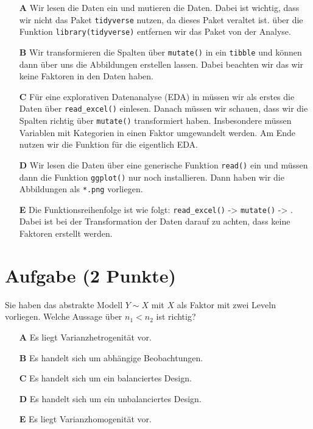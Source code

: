 \documentclass[a4paper, 9pt]{scrartcl}\usepackage[]{graphicx}\usepackage[]{xcolor}
\begin{document}
\begin{enumerate}
\item [\textbf{A} \msquare] Wir lesen die Daten ein und mutieren die Daten. Dabei ist wichtig, dass wir nicht das Paket \texttt{tidyverse} nutzen, da dieses Paket veraltet ist. über die Funktion \texttt{library(tidyverse)} entfernen wir das Paket von der Analyse.
\item [\textbf{B} \msquare] Wir transformieren die Spalten über \texttt{mutate()} in ein \texttt{tibble} und können dann über  uns die Abbildungen erstellen lassen. Dabei beachten wir das wir keine Faktoren in den Daten haben.
\item [\textbf{C} \msquare] Für eine explorativen Datenanalyse (EDA) in \Rlogo müssen wir als erstes die Daten über \texttt{read\_excel()} einlesen. Danach müssen wir schauen, dass wir die Spalten richtig über \texttt{mutate()} transformiert haben. Insbesondere müssen Variablen mit Kategorien in einen Faktor umgewandelt werden. Am Ende nutzen wir die Funktion  für die eigentlich EDA.
\item [\textbf{D} \msquare] Wir lesen die Daten über eine generische Funktion \texttt{read()} ein und müssen dann die Funktion \texttt{ggplot()} nur noch installieren. Dann haben wir die Abbildungen als \texttt{*.png} vorliegen.
\item [\textbf{E} \msquare] Die Funktionsreihenfolge ist wie folgt: \texttt{read\_excel()} ->  \texttt{mutate()} -> . Dabei ist bei der Transformation der Daten darauf zu achten, dass keine Faktoren erstellt werden.
\end{enumerate}

\section{Aufgabe \hfill (2 Punkte)}



Sie haben das abstrakte Modell $Y \sim X$ mit $X$ als Faktor mit zwei Leveln vorliegen. Welche Aussage über $n_1 < n_2$ ist richtig?



\begin{enumerate}
\item [\textbf{A} \msquare] Es liegt Varianzhetrogenität vor.
\item [\textbf{B} \msquare] Es handelt sich um abhängige Beobachtungen.
\item [\textbf{C} \msquare] Es handelt sich um ein balanciertes Design.
\item [\textbf{D} \msquare] Es handelt sich um ein unbalanciertes Design.
\item [\textbf{E} \msquare] Es liegt Varianzhomogenität vor.
\end{enumerate}
\end{document}
